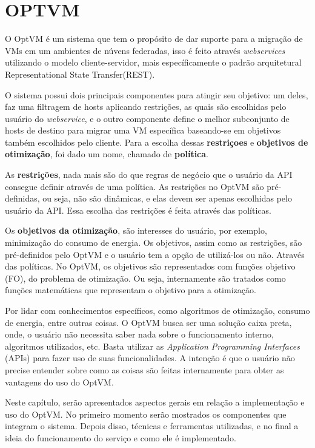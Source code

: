 \chapter{OPTVM}

O OptVM é um sistema que tem o propósito de dar suporte para a migração de VMs em um ambientes de núvens federadas,
isso é feito através \textit{webservices} utilizando o modelo cliente-servidor, mais específicamente o padrão arquitetural 
Representational State Transfer(REST).

O sistema possui dois principais componentes para atingir seu objetivo: um deles, faz uma filtragem de hosts aplicando restrições,
as quais são escolhidas pelo usuário do \textit{webservice}, e o 
outro componente define o melhor subconjunto de hosts de destino para migrar uma VM específica 
baseando-se em objetivos também escolhidos pelo cliente. 
Para a escolha dessas \textbf{restriçoes} e \textbf{objetivos de otimização}, foi dado um nome,
chamado de \textbf{política}. 

As \textbf{restrições}, nada mais são do que regras de negócio que o usuário da API consegue definir através de uma política.
As restrições no OptVM são pré-definidas, ou seja, não são dinâmicas, e elas devem ser apenas escolhidas pelo 
usuário da API. Essa escolha das restrições é feita através das políticas.

Os \textbf{objetivos da otimização}, são interesses do usuário, por exemplo, minimização do consumo de energia. Os objetivos,
assim como as restrições, são pré-definidos pelo OptVM e o usuário tem a opção de utilizá-los ou não. Através das políticas.
No OptVM, os objetivos são representados com funções objetivo (FO), do problema de otimização. Ou seja, internamente são tratados
como funções matemáticas que representam o objetivo para a otimização.

Por lidar com conhecimentos específicos, como algoritmos de otimização, consumo de energia, entre outras coisas. 
O OptVM busca ser uma solução caixa preta, onde, o usuário não necessita saber nada sobre o funcionamento interno, 
algoritmos utilizados, etc. Basta utilizar as \textit{Application Programming Interfaces} (APIs) para fazer uso de suas funcionalidades.
A intenção é que o usuário não precise entender sobre como as coisas são feitas internamente para obter as vantagens do uso do OptVM.

Neste capítulo, serão apresentados aspectos gerais em relação a implementação e uso do OptVM. 
No primeiro momento serão mostrados os componentes que integram o sistema. 
Depois disso, técnicas e ferramentas utilizadas, e no final a ideia do funcionamento do serviço e como ele é
implementado.

